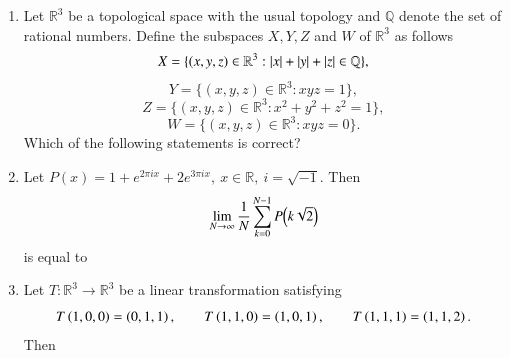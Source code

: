 \documentclass[journal,12pt,onecolumn]{IEEEtran}
\theoremstyle{remark}
\begin{document}
\begin{enumerate}[start=1, label=Q.\arabic*]
\hfill{}
\item Let $\mathbb{R}^{3}$ be a topological space with the usual topology and $\mathbb{Q}$ denote the set of rational numbers. Define the subspaces $X,Y,Z$ and $W$ of $\mathbb{R}^{3}$ as follows\brak{:}
\[
X=\{(x,y,z)\in \mathbb{R}^{3} : \left\vert x\right\vert+\left\vert y\right\vert+\left\vert z\right\vert\in \mathbb{Q}\},
\]
\[
Y=\{(x,y,z)\in \mathbb{R}^{3} : xyz=1\},
\]
\[
Z=\{(x,y,z)\in \mathbb{R}^{3} : x^{2}+y^{2}+z^{2}=1\},
\]
\[
W=\{(x,y,z)\in \mathbb{R}^{3} : xyz=0\}.
\]
Which of the following statements is correct?
\begin{enumerate}
\end{enumerate}

\hfill{}


\item Let $P(x)=1+e^{2\pi i x}+2e^{3\pi i x},\ x\in \mathbb{R},\ i=\sqrt{-1}$. Then
\[
\lim_{N\to\infty}\frac{1}{N}\sum_{k=0}^{N-1} P\!\left(k\sqrt{2}\right)
\]
is equal to
\begin{enumerate}
\end{enumerate}

\hfill{}
\item Let $T : \mathbb{R}^{3}\to \mathbb{R}^{3}$ be a linear transformation satisfying
\[
T\left(1,0,0\right)=\left(0,1,1\right),\qquad
T\left(1,1,0\right)=\left(1,0,1\right),\qquad
T\left(1,1,1\right)=\left(1,1,2\right).
\]
Then
\begin{enumerate}
\end{enumerate}


\end{enumerate}
\end{document}
